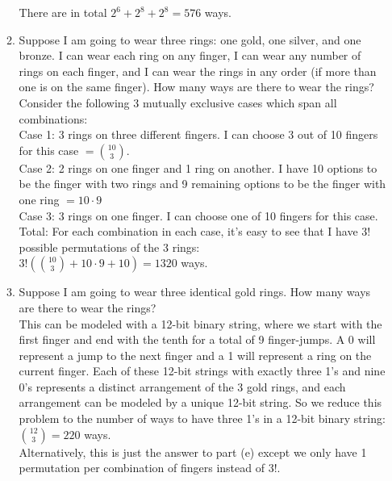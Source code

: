\documentclass[11pt,fleqn]{article}
\begin{document}
\begin{enumerate}
\begin{enumerate}
There are in total $2^6 + 2^8 + 2^8 = 576$ ways.
\newpage
\item Suppose I am going to wear three rings: one gold, one silver,
and one bronze. 
I can wear each ring on any finger,
I can wear any number of rings on each finger,
and I can wear the rings in any order 
(if more than one is on the same finger). 
How many ways
are there to wear the rings? \\
Consider the following 3 mutually exclusive cases which span all combinations: \\
Case 1: 3 rings on three different fingers. I can choose 3 out of 10 fingers for this case $=\binom{10}{3}$. \\
Case 2: 2 rings on one finger and 1 ring on another. I have 10 options to be the finger with two rings and 9 remaining options to be the finger with one ring $=10\cdot9$ \\
Case 3: 3 rings on one finger. I can choose one of 10 fingers for this case. \\
Total: For each combination in each case, it's easy to see that I have $3!$ possible permutations of the 3 rings: \\
$3!(\binom{10}{3} + 10\cdot9 + 10) = 1320$ ways.
\item Suppose I am going to wear three identical gold rings.
How many ways are there to wear the rings? \\
This can be modeled with a 12-bit binary string, where we start with the first finger and end with the tenth for a total of 9 finger-jumps. A 0 will represent a jump to the next finger and a 1 will represent a ring on the current finger. Each of these 12-bit strings with exactly three 1's and nine 0's represents a distinct arrangement of the 3 gold rings, and each arrangement can be modeled by a unique 12-bit string. So we reduce this problem to the number of ways to have three 1's in a 12-bit binary string: \\
$\binom{12}{3} = 220$ ways. \\
Alternatively, this is just the answer to part (e) except we only have 1 permutation per combination of fingers instead of $3!$.
\end{enumerate}


\end{enumerate}
\end{document}
